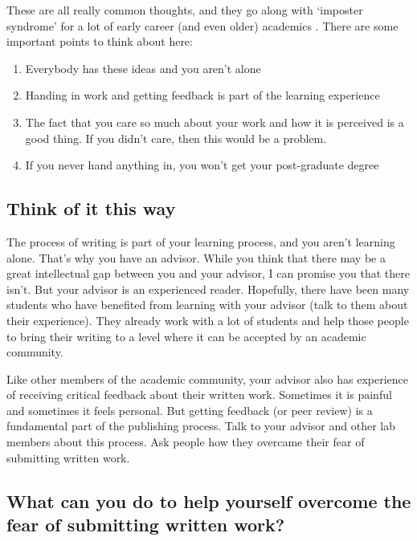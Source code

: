 \documentclass[
]{krantz}
\providecommand{\tightlist}{%
  \setlength{\itemsep}{0pt}\setlength{\parskip}{0pt}}
\begin{document}
These are all really common thoughts, and they go along with `imposter syndrome' for a lot of early career (and even older) academics \citep[\citet{hutchins2017what}]{woolston2016faking}. There are some important points to think about here:

\begin{enumerate}
\def\labelenumi{\arabic{enumi}.}
\tightlist
\item
  Everybody has these ideas and you aren't alone
\item
  Handing in work and getting feedback is part of the learning experience
\item
  The fact that you care so much about your work and how it is perceived is a good thing. If you didn't care, then this would be a problem.
\item
  If you never hand anything in, you won't get your post-graduate degree
\end{enumerate}

\hypertarget{think-of-it-this-way}{%
\subsection{Think of it this way}\label{think-of-it-this-way}}

The process of writing is part of your learning process, and you aren't learning alone. That's why you have an advisor. While you think that there may be a great intellectual gap between you and your advisor, I can promise you that there isn't. But your advisor is an experienced reader. Hopefully, there have been many students who have benefited from learning with your advisor (talk to them about their experience). They already work with a lot of students and help those people to bring their writing to a level where it can be accepted by an academic community.

Like other members of the academic community, your advisor also has experience of receiving critical feedback about their written work. Sometimes it is painful and sometimes it feels personal. But getting feedback (or peer review) is a fundamental part of the publishing process. Talk to your advisor and other lab members about this process. Ask people how they overcame their fear of submitting written work.

\hypertarget{what-can-you-do-to-help-yourself-overcome-the-fear-of-submitting-written-work}{%
\subsection{What can you do to help yourself overcome the fear of submitting written work?}\label{what-can-you-do-to-help-yourself-overcome-the-fear-of-submitting-written-work}}
\end{document}
